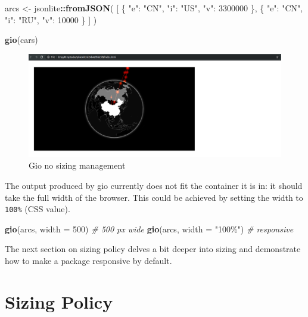 \documentclass[
]{krantz}
\makeatletter
\newenvironment{Shaded}{\begin{snugshade}}{\end{snugshade}}
\newcommand{\CommentTok}[1]{\textcolor[rgb]{0.37,0.37,0.37}{\textit{#1}}}
\newcommand{\DataTypeTok}[1]{\textcolor[rgb]{0.27,0.27,0.27}{#1}}
\newcommand{\DecValTok}[1]{\textcolor[rgb]{0.06,0.06,0.06}{#1}}
\newcommand{\KeywordTok}[1]{\textcolor[rgb]{0.27,0.27,0.27}{\textbf{#1}}}
\newcommand{\NormalTok}[1]{#1}
\newcommand{\OperatorTok}[1]{\textcolor[rgb]{0.43,0.43,0.43}{\textbf{#1}}}
\newcommand{\StringTok}[1]{\textcolor[rgb]{0.5,0.5,0.5}{#1}}
\newenvironment{kframe}{%
\medskip{}
\setlength{\fboxsep}{.8em}
 \def\at@end@of@kframe{}%
 \ifinner\ifhmode%
  \def\at@end@of@kframe{\end{minipage}}%
  \begin{minipage}{\columnwidth}%
 \fi\fi%
 \def\FrameCommand##1{\hskip\@totalleftmargin \hskip-\fboxsep
 \colorbox{shadecolor}{##1}\hskip-\fboxsep
     \hskip-\linewidth \hskip-\@totalleftmargin \hskip\columnwidth}%
 \MakeFramed {\advance\hsize-\width
   \@totalleftmargin\z@ \linewidth\hsize
   \@setminipage}}%
 {\par\unskip\endMakeFramed%
 \at@end@of@kframe}
\renewenvironment{Shaded}{\begin{kframe}}{\end{kframe}}
\makeatother
\begin{document}
\begin{Shaded}
\begin{Highlighting}[]
\NormalTok{arcs <{-}}\StringTok{ }\NormalTok{jsonlite}\OperatorTok{::}\KeywordTok{fromJSON}\NormalTok{(}
  \StringTok{\textquotesingle{}[}
\StringTok{    \{}
\StringTok{      "e": "CN",}
\StringTok{      "i": "US",}
\StringTok{      "v": 3300000}
\StringTok{    \},}
\StringTok{    \{}
\StringTok{      "e": "CN",}
\StringTok{      "i": "RU",}
\StringTok{      "v": 10000}
\StringTok{    \}}
\StringTok{  ]\textquotesingle{}}
\NormalTok{)}

\KeywordTok{gio}\NormalTok{(cars)}
\end{Highlighting}
\end{Shaded}

\begin{figure}
\centering
\includegraphics{images/gio-size-issue.png}
\caption{Gio no sizing management}
\end{figure}

The output produced by gio currently does not fit the container it is in: it should take the full width of the browser. This could be achieved by setting the width to \texttt{100\%} (CSS value).

\begin{Shaded}
\begin{Highlighting}[]
\KeywordTok{gio}\NormalTok{(arcs, }\DataTypeTok{width =} \DecValTok{500}\NormalTok{) }\CommentTok{\# 500 px wide}
\KeywordTok{gio}\NormalTok{(arcs, }\DataTypeTok{width =} \StringTok{"100\%"}\NormalTok{) }\CommentTok{\# responsive}
\end{Highlighting}
\end{Shaded}

The next section on sizing policy delves a bit deeper into sizing and demonstrate how to make a package responsive by default.

\hypertarget{sizing-policy}{%
\section{Sizing Policy}\label{sizing-policy}}
\end{document}
